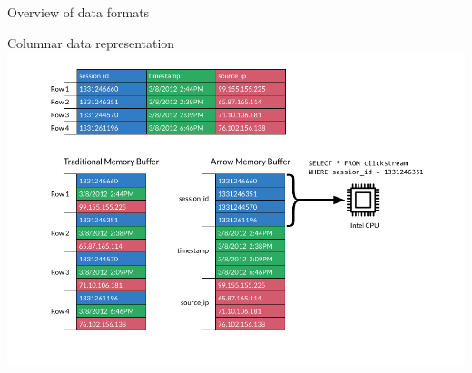\documentclass{beamer}
\begin{document}
\begin{frame}{Overview of data formats}
\end{frame}

\begin{frame}{Columnar data representation}
\vspace{0.2 cm}
\mbox{\hspace{-0.8 cm}\includegraphics[width=1.2\linewidth]{simd.png}}
\end{frame}
\end{document}
